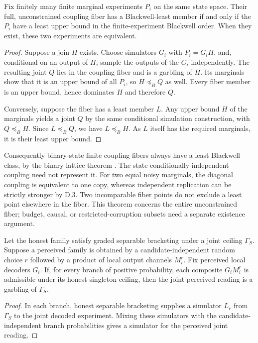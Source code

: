 \begin{thmplain}
Fix finitely many finite marginal experiments $P_i$ on the same state space. Their full, unconstrained coupling fiber has a Blackwell-least member if and only if the $P_i$ have a least upper bound in the finite-experiment Blackwell order. When they exist, these two experiments are equivalent.
\end{thmplain}
\begin{proof}
Suppose a join $H$ exists. Choose simulators $G_i$ with $P_i=G_iH$, and, conditional on an output of $H$, sample the outputs of the $G_i$ independently. The resulting joint $Q$ lies in the coupling fiber and is a garbling of $H$. Its marginals show that it is an upper bound of all $P_i$, so $H\preceq_B Q$ as well. Every fiber member is an upper bound, hence dominates $H$ and therefore $Q$.

Conversely, suppose the fiber has a least member $L$. Any upper bound $H$ of the marginals yields a joint $Q$ by the same conditional simulation construction, with $Q\preceq_B H$. Since $L\preceq_B Q$, we have $L\preceq_B H$. As $L$ itself has the required marginals, it is their least upper bound.
\end{proof}

Consequently binary-state finite coupling fibers always have a least Blackwell class, by the binary lattice theorem \autocite[Proposition~16]{bertschinger2014}. The state-conditionally-independent coupling need not represent it. For two equal noisy marginals, the diagonal coupling is equivalent to one copy, whereas independent replication can be strictly stronger by D.3. Two incomparable fiber points do not exclude a least point elsewhere in the fiber. This theorem concerns the entire unconstrained fiber; budget, causal, or restricted-corruption subsets need a separate existence argument.


\begin{thmplain}
Let the honest family satisfy graded separable bracketing under a joint ceiling $\Gamma_S$. Suppose a perceived family is obtained by a candidate-independent random choice $r$ followed by a product of local output channels $M_i^r$. Fix perceived local decoders $G_i$. If, for every branch of positive probability, each composite $G_iM_i^r$ is admissible under its honest singleton ceiling, then the joint perceived reading is a garbling of $\Gamma_S$.
\end{thmplain}
\begin{proof}
In each branch, honest separable bracketing supplies a simulator $L_r$ from $\Gamma_S$ to the joint decoded experiment. Mixing these simulators with the candidate-independent branch probabilities gives a simulator for the perceived joint reading.
\end{proof}


